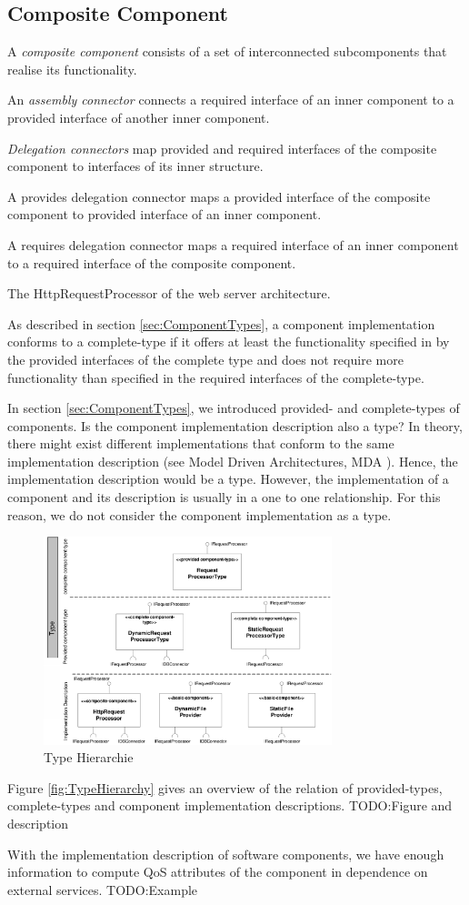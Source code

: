 \subsection{Composite Component}
A \emph{composite component} consists of a set of interconnected subcomponents that
realise its functionality. 

An \emph{assembly connector} connects a required interface of an inner component to a provided interface
of another inner component. 

\emph{Delegation connectors} map provided and required
interfaces of the composite component to interfaces of its inner
structure. 

A provides delegation connector maps
a provided interface of the composite component to provided interface of an
inner component. 

A requires delegation connector maps a required interface of an
inner component to a required interface of the composite component.

The HttpRequestProcessor of the web server architecture.

As described in section \ref{sec:ComponentTypes}, a component implementation
conforms to a complete-type if it offers at least the functionality specified
in by the provided interfaces of the complete type and does not require more
functionality than specified in the required interfaces of the complete-type.

In section \ref{sec:ComponentTypes}, we introduced provided- and complete-types
of components. Is the component implementation description also a type? In
theory, there might exist different implementations that conform to the same
implementation description (see Model Driven Architectures, MDA
\cite{TODO:reference}). Hence, the implementation description would be a
type. However, the implementation of a component and its description is
usually in a one to one relationship. For this reason, we do not consider the
component implementation as a type. 

\begin{figure}[htbp]
\centering
\includegraphics[width=3.3in]{example/TypeHierachy}
\caption{Type Hierarchie}
\label{fig:WebserverComponents}
\end{figure}

Figure \ref{fig:TypeHierarchy} gives an overview of the relation of
provided-types, complete-types and component implementation descriptions.
TODO:Figure and description

With the implementation description of software components, we have enough
information to compute QoS attributes of the component in dependence on external
services.
TODO:Example
